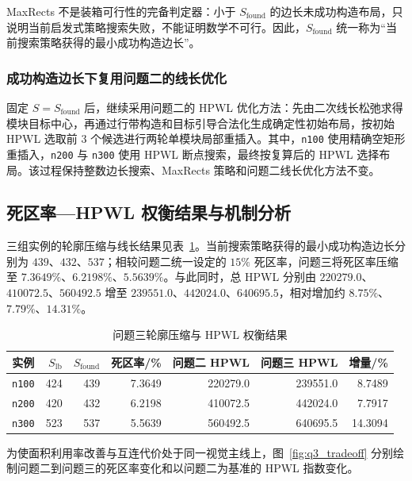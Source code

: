 MaxRects 不是装箱可行性的完备判定器：小于 $S_{\mathrm{found}}$ 的边长未成功构造布局，只说明当前启发式策略搜索失败，不能证明数学不可行。因此，$S_{\mathrm{found}}$ 统一称为“当前搜索策略获得的最小成功构造边长”。

\subsubsection{成功构造边长下复用问题二的线长优化}

固定 $S=S_{\mathrm{found}}$ 后，继续采用问题二的 HPWL 优化方法：先由二次线长松弛求得模块目标中心，再通过行带构造和目标引导合法化生成确定性初始布局，按初始 HPWL 选取前 $3$ 个候选进行两轮单模块局部重插入。其中，\texttt{n100} 使用精确空矩形重插入，\texttt{n200} 与 \texttt{n300} 使用 HPWL 断点搜索，最终按复算后的 HPWL 选择布局。该过程保持整数边长搜索、MaxRects 策略和问题二线长优化方法不变。

\subsection{死区率---HPWL 权衡结果与机制分析}

三组实例的轮廓压缩与线长结果见表~\ref{tab:q3_main_results}。当前搜索策略获得的最小成功构造边长分别为 $439$、$432$、$537$；相较问题二统一设定的 $15\%$ 死区率，问题三将死区率压缩至 $7.3649\%$、$6.2198\%$、$5.5639\%$。与此同时，总 HPWL 分别由 $220279.0$、$410072.5$、$560492.5$ 增至 $239551.0$、$442024.0$、$640695.5$，相对增加约 $8.75\%$、$7.79\%$、$14.31\%$。

\begin{table}[H]
  \centering
  \caption{问题三轮廓压缩与 HPWL 权衡结果}
  \label{tab:q3_main_results}
  \small
  \renewcommand{\arraystretch}{1.15}
  \begin{tabular}{c r r r r r r}
    \toprule
    实例 & $S_{\mathrm{lb}}$ & $S_{\mathrm{found}}$ & 死区率/\% & 问题二 HPWL & 问题三 HPWL & 增量/\% \\
    \midrule
    \texttt{n100} & 424 & 439 & 7.3649 & 220279.0 & 239551.0 & 8.7489 \\
    \texttt{n200} & 420 & 432 & 6.2198 & 410072.5 & 442024.0 & 7.7917 \\
    \texttt{n300} & 523 & 537 & 5.5639 & 560492.5 & 640695.5 & 14.3094 \\
    \bottomrule
  \end{tabular}
\end{table}

为使面积利用率改善与互连代价处于同一视觉主线上，图~\ref{fig:q3_tradeoff} 分别绘制问题二到问题三的死区率变化和以问题二为基准的 HPWL 指数变化。

